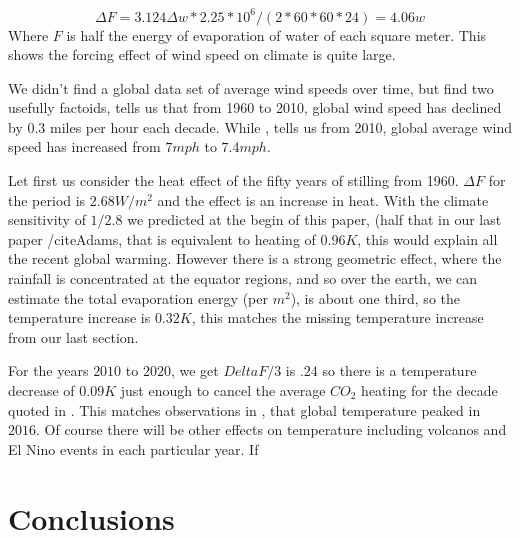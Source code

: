 \documentclass{book}
\begin{document}
   \begin{equation}
   	\Delta F = 3.124 \Delta w * 2.25*10^{6} / (2*60*60*24)  = 4.06 w
   \end{equation}
   Where $F$ is half the energy of evaporation of water of each square meter. This shows the forcing effect of wind speed on climate is quite large.
   
   We didn't find a global data set of average wind speeds over time, but find two usefully factoids, \cite{Horizion} tells us that from 1960 to 2010, global wind speed has declined by $0.3$ miles per hour each decade.
   While \cite{SciAmWind}, tells us from 2010, global average wind speed has increased from $7 mph$ to $7.4 mph$.
   
   Let first us consider the heat effect of the fifty years of stilling from 1960. $\Delta F$ for the period is $2.68 W/m^2$ and the effect is an increase in heat. With the climate sensitivity of $1/2.8$ we predicted at the begin of this paper, (half that in our last paper /cite{Adams}, that is equivalent to heating of $0.96K$, this would explain all the recent global warming. However there is a strong geometric effect, where the rainfall is concentrated at the equator regions, and so over the earth, we can estimate the total evaporation energy (per $m^2$), is about one third, so the temperature increase is $0.32 K$, this matches the missing temperature increase from our last section. 
   
   For the years $2010$ to $2020$, we get $Delta F/3$ is $.24$ so there is a temperature decrease of $0.09K$ just enough to cancel the average $CO_2$ heating for the decade quoted in \cite{GlobTemp}. This matches observations in  \cite{GlobTemp}, that global temperature peaked in $2016$. Of course there will be other effects on temperature including volcanos and El Nino events in each particular year. If  
           	
   \section{Conclusions}
   
\end{document}
